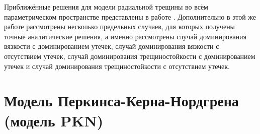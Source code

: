 Приближённые решения для модели радиальной трещины во всём параметрическом пространстве представлены в работе \cite{dontsov2}.
Дополнительно в этой же работе \cite{dontsov2} рассмотрены несколько предельных случаев, для которых получены точные аналитические решения, а именно рассмотрены случай доминирования вязкости с доминированием утечек, случай доминирования вязкости с отсутствием утечек, случай доминирования трещиностойкости с доминированием утечек и случай доминирования трещиностойкости с отсутствием утечек.

\section{Модель Перкинса-Керна-Нордгрена (модель PKN)}
\vspace*{-5mm}

